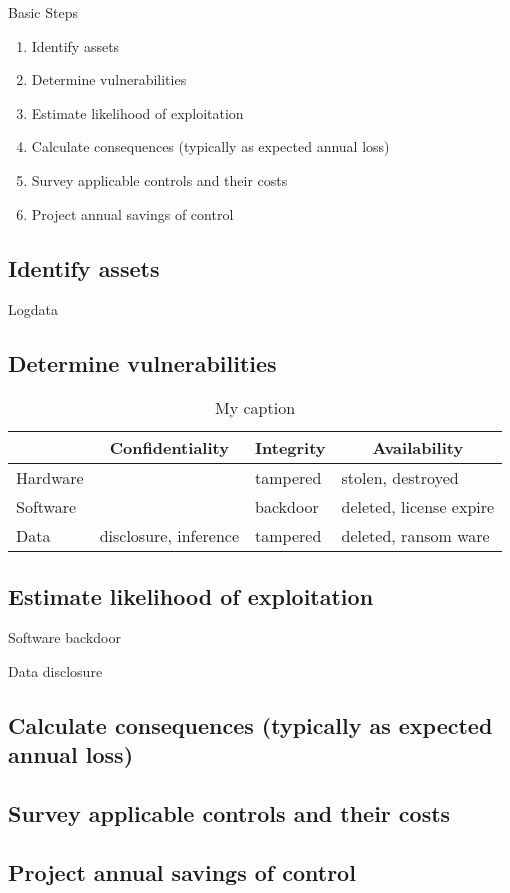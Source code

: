 
Basic Steps
\begin{enumerate}
    \item Identify assets
    \item Determine vulnerabilities
    \item Estimate likelihood of exploitation
    \item Calculate consequences (typically as expected annual loss)
    \item Survey applicable controls and their costs
    \item Project annual savings of control
\end{enumerate}

\subsection{Identify assets}
Logdata

\subsection{Determine vulnerabilities}
\begin{table}[h!]
  \centering
  \caption{My caption}
  \label{my-label}
  \begin{tabular}{|l|lll|}
    \hline
    \multicolumn{1}{|c|}{} & \multicolumn{1}{c|}{Confidentiality} & \multicolumn{1}{c|}{Integrity} & \multicolumn{1}{c|}{Availability} \\ \hline
    Hardware               &                                      & tampered                       & stolen, destroyed                 \\ \cline{1-1}
    Software               &                                      & backdoor                       & deleted, license expire           \\ \cline{1-1}
    Data                   & disclosure, inference                & tampered                       & deleted, ransom ware              \\ \hline
  \end{tabular}
\end{table}

\subsection{Estimate likelihood of exploitation}
Software backdoor

Data disclosure

\subsection{Calculate consequences (typically as expected annual loss)}
\subsection{Survey applicable controls and their costs}
\subsection{Project annual savings of control}
